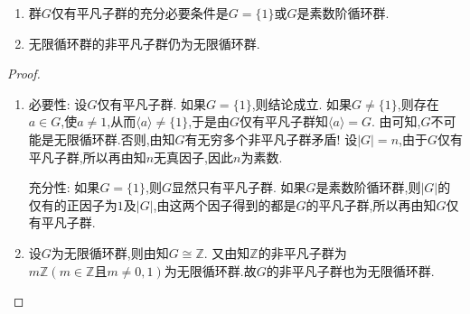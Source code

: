 \documentclass[../../main.tex]{subfiles}%
\begin{document}
\begin{corollary}\label{corollary:群仅有平凡子群的充要条件}
\begin{enumerate}[(1)]
\item\label{corollary:群仅有平凡子群的充要条件-1} 群$G$仅有平凡子群的充分必要条件是$G = \{1\}$或$G$是素数阶循环群.

\item\label{corollary:群仅有平凡子群的充要条件-2} 无限循环群的非平凡子群仍为无限循环群.
\end{enumerate}
\end{corollary}
\begin{proof}
\begin{enumerate}[(1)]
\item {\heiti 必要性:} 设$G$仅有平凡子群. 如果$G = \{1\}$,则结论成立. 如果$G \neq \{1\}$,则存在$a \in G$,使$a\neq 1$,从而$\langle a \rangle \neq \{1\}$,于是由$G$仅有平凡子群知$\langle a \rangle = G$. 由可知,$G$不可能是无限循环群.否则,由知$G$有无穷多个非平凡子群矛盾! 设$|G|=n$,由于$G$仅有平凡子群,所以再由知$n$无真因子,因此$n$为素数.

{\heiti 充分性:} 如果$G = \{1\}$,则$G$显然只有平凡子群. 如果$G$是素数阶循环群,则$|G|$的仅有的正因子为$1$及$|G|$,由这两个因子得到的都是$G$的平凡子群,所以再由知$G$仅有平凡子群.

\item 设$G$为无限循环群,则由知$G\cong \mathbb{Z}.$
又由知$\mathbb{Z}$的非平凡子群为$m\mathbb{Z}(m\in \mathbb{Z}\text{且}m\neq 0,1)$为无限循环群.故$G$的非平凡子群也为无限循环群.
\end{enumerate}
\end{proof}
\end{document}
